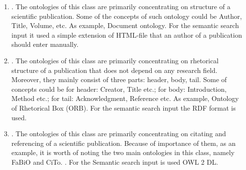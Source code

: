 			\begin{enumerate}
				\item {}\frqq. The ontologies of this class are primarily concentrating on structure of a scientific publication. Some of the concepts of such ontology could be Author, Title, Volume, etc. As example, Document ontology. For the semantic search input it used a simple extension of HTML-file that an author of a publication should enter manually.
				
				\item {}\frqq. The ontologies of this class are primarily concentrating on rhetorical structure of a publication that does not depend on any research field. Moreover, they mainly consist of three parts: header, body, tail. Some of concepts could be for header: Creator, Title etc.; for body: Introduction, Method etc.; for tail: Acknowledgment, Reference etc. As example, Ontology of Rhetorical Box (ORB). For the semantic search input the RDF format is used.  
				
				\item {}\frqq.  The ontologies of this class are primarily concentrating on citating and referencing of a scientific publication. Because of importance of them, as an example, it is worth of noting the two main ontologies in this class, namely FaBiO and CiTo. \frqq\cite{Per12}. For the Semantic search input is used OWL 2 DL. 
			\end{enumerate}
